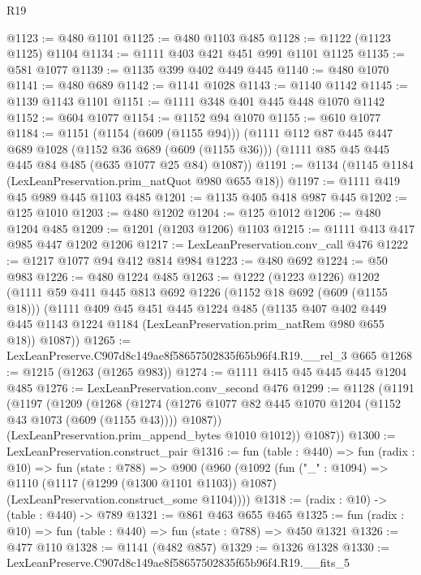 \begin{lexlean}{R19}
\begin{coremodule}
@1123 := @480 @1101
@1125 := @480 @1103 @485
@1128 := @1122 (@1123 @1125) @1104
@1134 := @1111 @403 @421 @451 @991 @1101 @1125
@1135 := @581 @1077
@1139 := @1135 @399 @402 @449 @445
@1140 := @480 @1070
@1141 := @480 @689
@1142 := @1141 @1028
@1143 := @1140 @1142
@1145 := @1139 @1143 @1101
@1151 := @1111 @348 @401 @445 @448 @1070 @1142
@1152 := @604 @1077
@1154 := @1152 @94 @1070
@1155 := @610 @1077
@1184 := @1151
    (@1154 (@609 (@1155 @94)))
    (@1111
      @112
      @87
      @445
      @447
      @689
      @1028
      (@1152 @36 @689 (@609 (@1155 @36)))
      (@1111 @85 @45 @445 @445 @84 @485 (@635 @1077 @25 @84) @1087))
@1191 := @1134 (@1145 @1184 (LexLeanPreservation.prim_natQuot @980 @655 @18))
@1197 := @1111 @419 @45 @989 @445 @1103 @485
@1201 := @1135 @405 @418 @987 @445
@1202 := @125 @1010
@1203 := @480 @1202
@1204 := @125 @1012
@1206 := @480 @1204 @485
@1209 := @1201 (@1203 @1206) @1103
@1215 := @1111 @413 @417 @985 @447 @1202 @1206
@1217 := LexLeanPreservation.conv_call @476
@1222 := @1217 @1077 @94 @412 @814 @984
@1223 := @480 @692
@1224 := @50 @983
@1226 := @480 @1224 @485
@1263 := @1222
    (@1223 @1226)
    @1202
    (@1111
      @59
      @411
      @445
      @813
      @692
      @1226
      (@1152 @18 @692 (@609 (@1155 @18)))
      (@1111
        @409
        @45
        @451
        @445
        @1224
        @485
        (@1135
          @407
          @402
          @449
          @445
          @1143
          @1224
          @1184
          (LexLeanPreservation.prim_natRem @980 @655 @18))
        @1087))
@1265 := LexLeanPreserve.C907d8c149ae8f58657502835f65b96f4.R19.__rel_3 @665
@1268 := @1215 (@1263 (@1265 @983))
@1274 := @1111 @415 @45 @445 @445 @1204 @485
@1276 := LexLeanPreservation.conv_second @476
@1299 := @1128
    (@1191
      (@1197
        (@1209
          (@1268
            (@1274 (@1276 @1077 @82 @445 @1070 @1204 (@1152 @43 @1073 (@609 (@1155 @43)))) @1087))
          (LexLeanPreservation.prim_append_bytes @1010 @1012))
        @1087))
@1300 := LexLeanPreservation.construct_pair
@1316 := fun (table : @440) =>
  fun (radix : @10) =>
  fun (state : @788) =>
  @900
    (@960
      (@1092
        (fun ("_" : @1094) =>
        @1110
          (@1117 (@1299 (@1300 @1101 @1103)) @1087)
          (LexLeanPreservation.construct_some @1104))))
@1318 := (radix : @10) -> (table : @440) -> @789
@1321 := @861 @463 @655 @465
@1325 := fun (radix : @10) => fun (table : @440) => fun (state : @788) => @450 @1321
@1326 := @477 @110
@1328 := @1141 (@482 @857)
@1329 := @1326 @1328
@1330 := LexLeanPreserve.C907d8c149ae8f58657502835f65b96f4.R19.__fits_5

\end{coremodule}
\end{lexlean}
